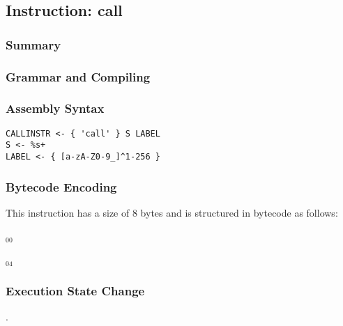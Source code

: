 \subsection{Instruction: call}

\subsubsection{Summary}


\subsubsection{Grammar and Compiling}


\subsubsection{Assembly Syntax}

\begin{myquote}
\begin{verbatim}
CALLINSTR <- { 'call' } S LABEL
S <- %s+
LABEL <- { [a-zA-Z0-9_]^1-256 }
\end{verbatim}
\end{myquote}

\subsubsection{Bytecode Encoding}

This instruction has a size of 8 bytes and is structured in bytecode as follows:

$_{00}$\ 



$_{04}$\ 


\subsubsection{Execution State Change}

.


